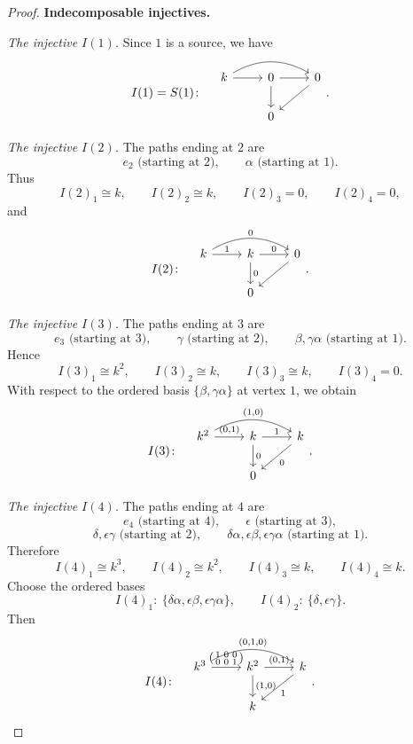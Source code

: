 \documentclass[11pt, a4paper]{article}
\begin{document}
\begin{enumerate}[leftmargin=*, label=\textbf{\arabic*.}]
\begin{proof}
    \medskip
    \noindent\textbf{Indecomposable injectives.}
    
    \smallskip
    \noindent\emph{The injective $I(1)$.}
    Since $1$ is a source, we have
    \[
    I(1)=S(1)\colon\quad
    \begin{tikzcd}
    k \arrow[r] \arrow[rr, bend left] & 0 \arrow[r] \arrow[d] & 0 \arrow[ld] \\
                                      & 0 &
    \end{tikzcd}.
    \]
    
    \smallskip
    \noindent\emph{The injective $I(2)$.}
    The paths ending at $2$ are
    \[
    e_2 \text{ (starting at $2$)},\qquad \alpha \text{ (starting at $1$)}.
    \]
    Thus
    \[
    I(2)_1\cong k,\qquad I(2)_2\cong k,\qquad I(2)_3=0,\qquad I(2)_4=0,
    \]
    and
    \[
    I(2)\colon\quad
    \begin{tikzcd}
    k \arrow[r, "1"] \arrow[rr, bend left, "0"]
    & k \arrow[r, "0"] \arrow[d, "0"]
    & 0 \arrow[ld] \\
    & 0 &
    \end{tikzcd}.
    \]
    
    \smallskip
    \noindent\emph{The injective $I(3)$.}
    The paths ending at $3$ are
    \[
    e_3 \text{ (starting at $3$)},\qquad
    \gamma \text{ (starting at $2$)},\qquad
    \beta,\gamma\alpha \text{ (starting at $1$)}.
    \]
    Hence
    \[
    I(3)_1\cong k^2,\qquad I(3)_2\cong k,\qquad I(3)_3\cong k,\qquad I(3)_4=0.
    \]
    With respect to the ordered basis $\{\beta,\gamma\alpha\}$ at vertex $1$, we obtain
    \[
    I(3)\colon\quad
    \begin{tikzcd}
    k^2 \arrow[r, "{(0,1)}"] \arrow[rr, bend left, "{(1,0)}"]
    & k \arrow[r, "1"] \arrow[d, "0"]
    & k \arrow[ld, "0"] \\
    & 0 &
    \end{tikzcd}.
    \]
    
    \smallskip
    \noindent\emph{The injective $I(4)$.}
    The paths ending at $4$ are
    \[
    e_4 \text{ (starting at $4$)},\qquad
    \epsilon \text{ (starting at $3$)},
    \]
    \[
    \delta,\epsilon\gamma \text{ (starting at $2$)},
    \qquad
    \delta\alpha,\epsilon\beta,\epsilon\gamma\alpha \text{ (starting at $1$)}.
    \]
    Therefore
    \[
    I(4)_1\cong k^3,\qquad I(4)_2\cong k^2,\qquad I(4)_3\cong k,\qquad I(4)_4\cong k.
    \]
    Choose the ordered bases
    \[
    I(4)_1:\ \{\delta\alpha,\epsilon\beta,\epsilon\gamma\alpha\},
    \qquad
    I(4)_2:\ \{\delta,\epsilon\gamma\}.
    \]
    Then
    \[
    I(4)\colon\quad
    \begin{tikzcd}[ampersand replacement=\&]
    k^3
    \arrow[r, "{\begin{psmallmatrix}
    1&0&0\\
    0&0&1
    \end{psmallmatrix}}"]
    \arrow[rr, bend left, "{(0,1,0)}"]
    \&
    k^2 \arrow[r, "{(0,1)}"] \arrow[d, "{(1,0)}"]
    \&
    k \arrow[ld, "1"] \\
    \& k \&
    \end{tikzcd}.
    \]
    

\end{proof}
\end{enumerate}
\end{document}
